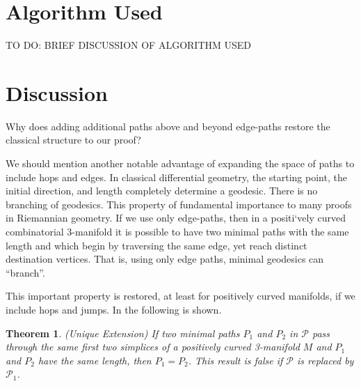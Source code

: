 \documentclass[12pt]{article}
\newtheorem{thm}{Theorem}[section]
\begin{document}
\section{Algorithm Used}

TO DO: BRIEF DISCUSSION OF ALGORITHM USED

\section{Discussion}
Why does adding additional paths above and beyond edge-paths restore the classical structure to our proof?


We should mention another notable advantage of expanding the space of paths to include hops and edges. In classical differential geometry, the starting point, the initial direction, and length completely determine a geodesic. There is no branching of geodesics. This property of fundamental importance to many proofs in Riemannian geometry. If we use only edge-paths, then in a positi`vely curved combinatorial 3-manifold it is possible to have two minimal paths with the same length and which begin by traversing the same edge, yet reach distinct destination vertices. That is, using only edge paths, minimal geodesics can ``branch''.

This important property is restored, at least for positively curved manifolds, if we include hops and jumps. In \cite{Trout10} the following is shown.

\begin{thm}(Unique Extension) If two minimal paths $P_1$ and $P_2$ in $\mathcal{P}$ pass through the same first two simplices of a positively curved 3-manifold $M$ and $P_1$ and $P_2$ have the same length, then $P_1 = P_2$. This result is false if $\mathcal{P}$ is replaced by $\mathcal{P}_1$.
\end{thm}



\end{document}
